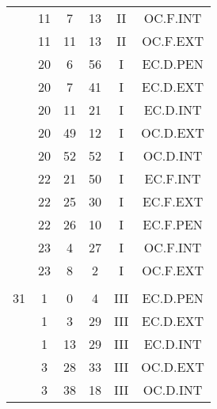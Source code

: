 \documentclass[12pt, a4paper]{article}
\begin{document}
\begin{multicols}{3}
{\begin{tabular}{c c c c c c}
	 	 	 	 & 11 & 7 & 13 & II & OC.F.INT\\%
	 	 	 	 & 11 & 11 & 13 & II & OC.F.EXT\\%
	 	 	 	 & 20 & 6 & 56 & I & EC.D.PEN\\%
	 	 	 	 & 20 & 7 & 41 & I & EC.D.EXT\\%
	 	 	 	 & 20 & 11 & 21 & I & EC.D.INT\\%
	 	 	 	 & 20 & 49 & 12 & I & OC.D.EXT\\%
	 	 	 	 & 20 & 52 & 52 & I & OC.D.INT\\%
	 	 	 	 & 22 & 21 & 50 & I & EC.F.INT\\%
	 	 	 	 & 22 & 25 & 30 & I & EC.F.EXT\\%
	 	 	 	 & 22 & 26 & 10 & I & EC.F.PEN\\%
	 	 	 	 & 23 & 4 & 27 & I & OC.F.INT\\%
	 	 	 	 & 23 & 8 & 2 & I & OC.F.EXT\\%
	 	 	 	 & & & & & \\%
	 	 	 	31 & 1 & 0 & 4 & III & EC.D.PEN\\%
	 	 	 	 & 1 & 3 & 29 & III & EC.D.EXT\\%
	 	 	 	 & 1 & 13 & 29 & III & EC.D.INT\\%
	 	 	 	 & 3 & 28 & 33 & III & OC.D.EXT\\%
	 	 	 	 & 3 & 38 & 18 & III & OC.D.INT\\%
	 	 \end{tabular}
 	}
\end{multicols}
\end{document}
